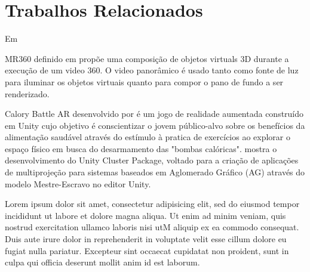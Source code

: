 \section{Trabalhos Relacionados}





Em \cite{wild2018inaccessibility}

MR360 definido em \cite{rhee2017mr360} propõe uma composição de objetos virtuals 3D durante a execução de um video 360. O video panorâmico é usado tanto como fonte de luz para iluminar os objetos virtuais quanto para compor o pano de fundo a ser renderizado.


Calory Battle AR desenvolvido por \cite{kim2014using} é um jogo de realidade aumentada construído em Unity cujo objetivo é conscientizar o jovem público-alvo sobre os benefícios da alimentação saudável através do estímulo à pratica de exercícios ao explorar o espaço físico em busca do desarmamento das "bombas calóricas".
\cite{sv2015popolin} mostra o desenvolvimento do Unity Cluster Package, voltado para a criação de aplicações de multiprojeção para sistemas baseados em Aglomerado Gráfico (AG) através do modelo Mestre-Escravo no editor Unity.



Lorem ipsum dolor sit amet, consectetur adipisicing elit, sed do eiusmod
tempor incididunt ut labore et dolore magna aliqua. Ut enim ad minim veniam,
quis nostrud exercitation ullamco laboris nisi utM aliquip ex ea commodo
consequat. Duis aute irure dolor in reprehenderit in voluptate velit esse
cillum dolore eu fugiat nulla pariatur. Excepteur sint occaecat cupidatat non
proident, sunt in culpa qui officia deserunt mollit anim id est laborum.